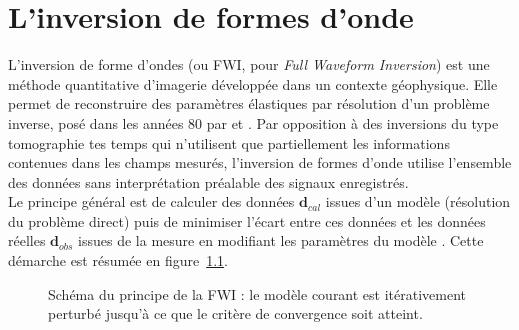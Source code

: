 \chapter{L'inversion de formes d'onde \label{fwi}}


L'inversion de forme d'ondes (ou FWI, pour \emph{Full Waveform Inversion}) est une méthode quantitative d'imagerie développée dans un contexte géophysique. Elle permet de reconstruire des paramètres élastiques par résolution d'un problème inverse, posé dans les années 80 par \cite{lailly} et \cite{tarantola_84}. Par opposition à des inversions du type tomographie tes temps qui n'utilisent que partiellement les informations contenues dans les champs mesurés, l'inversion de formes d'onde utilise l'ensemble des données sans interprétation préalable des signaux enregistrés.\\

Le principe général est de calculer des données $\bm{d}_{cal}$ issues d'un modèle (résolution du problème direct)  puis de minimiser l'écart entre ces données et les données réelles $\bm{d}_{obs}$ issues de la mesure en modifiant les paramètres du modèle \citep{virieux_review}. Cette démarche est résumée en figure~\ref{schema_fwi}. \\


\begin{figure}[!h]
	\caption{ Schéma du principe de la FWI : le modèle courant est itérativement perturbé jusqu'à ce que le critère de convergence soit atteint.\label{schema_fwi}}
\end{figure}

